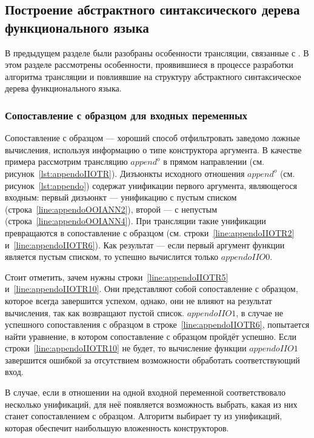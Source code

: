 \subsection{Построение абстрактного синтаксического дерева функционального языка}
\label{lab:ast}

В предыдущем разделе были разобраны особенности трансляции, связанные с \miniKanren{}.
В этом разделе рассмотрены особенности, проявившиеся в процессе разработки алгоритма трансляции и повлиявшие на структуру абстрактного синтаксическое дерева функционального языка.


\subsubsection{Сопоставление с образцом для входных переменных}

Сопоставление с образцом --- хороший способ отфильтровать заведомо ложные вычисления, используя информацию о типе конструктора аргумента.
В качестве примера рассмотрим трансляцию $append^o$ в прямом направлении (см. рисунок~\ref{lst:appendoIIOTR}).
Дизъюнкты исходного отношения $append^o$ (см. рисунок~\ref{lst:appendo}) содержат унификации первого аргумента, являющегося входным: первый дизъюнкт --- унификацию с пустым списком (строка~\ref{line:appendoOOIANN2}), второй --- с непустым (строка~\ref{line:appendoOOIANN4}).
При трансляции такие унификации превращаются в сопоставление с образцом (см. строки~\ref{line:appendoIIOTR2} и~\ref{line:appendoIIOTR6}).
Как результат --- если первый аргумент функции является пустым списком, то успешно вычислится только $appendoIIO0$.

Стоит отметить, зачем нужны строки~\ref{line:appendoIIOTR5} и~\ref{line:appendoIIOTR10}.
Они представляют собой сопоставление с образцом, которое всегда завершится успехом, однако, они не влияют на результат вычисления, так как возвращают пустой список.
$appendoIIO1$, в случае не успешного сопоставления с образцом в строке~\ref{line:appendoIIOTR6}, попытается найти уравнение, в котором сопоставление с образцом пройдёт успешно.
Если строки~\ref{line:appendoIIOTR10} не будет, то вычисление функции $appendoIIO1$ завершится ошибкой за отсутствием возможности обработать соответствующий вход.

В случае, если в отношении на \miniKanren{} одной входной переменной соответствовало несколько унификаций, для неё появляется возможность выбрать, какая из них станет сопоставлением с образцом.
Алгоритм выбирает ту из унификаций, которая обеспечит наибольшую вложенность конструкторов. 


